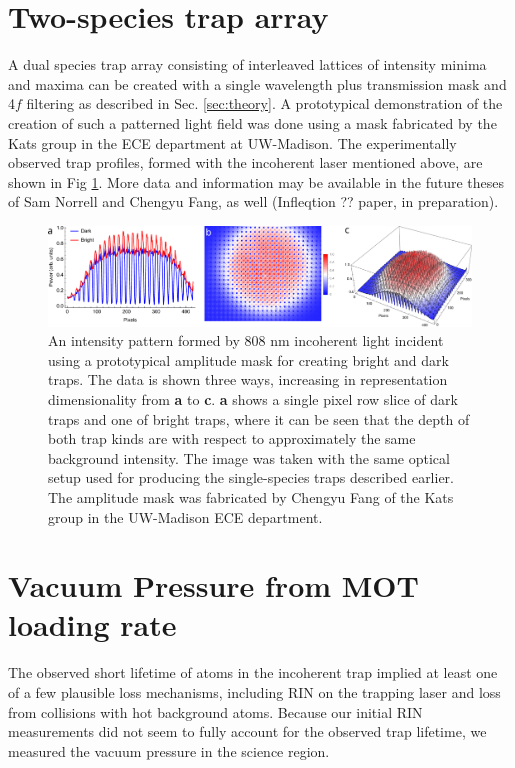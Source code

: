 \section{Two-species trap array}


A dual species trap array consisting of interleaved lattices of intensity minima and maxima can be created with a single wavelength plus transmission mask and 4$f$ filtering as described in Sec. \ref{sec:theory}. A prototypical demonstration of the creation of such a patterned light field was done using a mask fabricated by the Kats group in the ECE department at UW-Madison. The experimentally observed trap profiles, formed with the incoherent laser mentioned above, are shown in Fig \ref{fig:dual_species_traps}. More data and information may be available in the future theses of Sam Norrell and Chengyu Fang, as well (Infleqtion ?? paper, in preparation).

\begin{figure}
    \centering
    \includegraphics[width=\textwidth]{Images/first_dual_species_trap_image.pdf}
    \caption{An intensity pattern formed by 808 nm incoherent light incident using a prototypical amplitude mask for creating bright and dark traps. The data is shown three ways, increasing in representation dimensionality from \textbf{a} to \textbf{c}. \textbf{a} shows a single pixel row slice of dark traps and one of bright traps, where it can be seen that the depth of both trap kinds are with respect to approximately the same background intensity. The image was taken with the same optical setup used for producing the single-species traps described earlier. The amplitude mask was fabricated by Chengyu Fang of the Kats group in the UW-Madison ECE department.}
    \label{fig:dual_species_traps}
\end{figure}

\section{Vacuum Pressure from MOT loading rate}

The observed short lifetime of atoms in the incoherent trap implied at least one of a few plausible loss mechanisms, including RIN on the trapping laser and loss from collisions with hot background atoms. Because our initial RIN measurements did not seem to fully account for the observed trap lifetime, we measured the vacuum pressure in the science region. 

